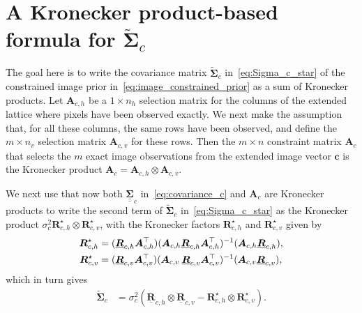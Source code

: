 \documentclass[12pt]{article}
\newcommand{\mycirc}[1] {\underline{\bm{#1}}}
\newcommand{\mybcirc}[1] {\underline{\underline{\bm{#1}}}}
\begin{document}
\section{A Kronecker product-based formula for \texorpdfstring{$\tilde{\bm{\Sigma}}_c$}{Sigma-tilde c}} \label{ap:refl_covariance}
The goal here is to write the covariance matrix $\tilde{\bm{\Sigma}}_c$ in~\eqref{eq:Sigma_c_star} of the constrained image prior in~\eqref{eq:image_constrained_prior} as a sum of Kronecker products.
Let $\bm{A}_{c, h}$ be a $1 \times n_h$ selection matrix for the columns of the extended lattice where pixels have been observed exactly. We next make the assumption that, for all these columns, the same rows have been observed, and define the $m \times n_v$ selection matrix $\bm{A}_{c, v}$ for these rows. Then the $m \times n$ constraint matrix $\bm{A}_c$ that selects the $m$ exact image observations from the extended image vector $\bm{c}$ is the Kronecker product $\bm{A}_c = \bm{A}_{c, h} \otimes \bm{A}_{c, v}$.

We next use that now both $\mybcirc{\Sigma}_c$ in~\eqref{eq:covariance_c} and $\bm{A}_c$ are Kronecker products to write the second term of $\tilde{\bm{\Sigma}}_c$ in~\eqref{eq:Sigma_c_star} as the Kronecker product $\sigma_c^2\bm{R}_{c, h}^{\star} \otimes  \bm{R}_{c, v}^{\star}$, with the Kronecker factors $\bm{R}_{c, h}^{\star}$ and $\bm{R}_{c, v}^{\star}$ given by 
\begin{equation} \label{eq:R_c_hv_star}
\begin{aligned}
    \bm{R}_{c, h}^{\star} &= (\mycirc{R}_{c, h}\bm{A}_{c, h}^{\top}) (\bm{A}_{c, h} \mycirc{R}_{c, h} \bm{A}_{c, h}^{\top})^{-1} (\bm{A}_{c, h} \mycirc{R}_{c, h}), \\
    \bm{R}_{c, v}^{\star} &=(\mycirc{R}_{c, v} \bm{A}_{c, v}^{\top})(\bm{A}_{c, v}\hspace*{0.07cm} \mycirc{R}_{c, v} \bm{A}_{c, v}^{\top})^{-1}(\bm{A}_{c, v} \mycirc{R}_{c, v}),
\end{aligned}
\end{equation}
which in turn gives
\begin{equation} \label{eq:Sigma_c_star_efficient_si}
\begin{split}
    \tilde{\bm{\Sigma}}_c
    &=  \sigma_c^2 \left( \mycirc{R}_{c, h} \otimes  \mycirc{R}_{c, v}  - \bm{R}_{c, h}^{\star} \otimes  \bm{R}_{c, v}^{\star} \right).
\end{split}
\end{equation}
\end{document}
